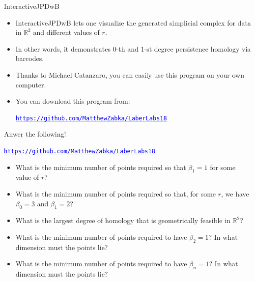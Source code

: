 \documentclass[usenames,dvipsnames,aspectratio=1610]{beamer}
\begin{document}

\begin{frame}{InteractiveJPDwB}
\begin{itemize}
\item InteractiveJPDwB lets one visualize the generated simplicial complex for data in $\mathbb{R}^2$ and different values of $r$.
\item In other words, it demonstrates $0$-th and $1$-st degree persistence homology via barcodes.
\item Thanks to Michael Catanzaro, you can easily use this program on your own computer.
\item You can download this program from:
\begin{center}
\hyperref[https://github.com/MatthewZabka/LaberLabs18]{\textcolor{blue}{\texttt{https://github.com/MatthewZabka/LaberLabs18}}}
\end{center}
\end{itemize}
\end{frame}


\begin{frame}{Anwer the following!}
\begin{center}
\hyperref[https://github.com/MatthewZabka/LaberLabs18]{\textcolor{blue}{\texttt{https://github.com/MatthewZabka/LaberLabs18}}}
\end{center}
\begin{itemize}
\item What is the minimum number of points required so that $\beta_1 = 1$ for some value of $r$?
\item What is the minimum number of points required so that, for some $r$, we have $\beta_0 = 3$ and $\beta_1 = 2$?
\item What is the largest degree of homology that is geometrically feasible in $\mathbb{R}^2$?
\item What is the minimum number of points required to have $\beta_2 = 1$? In what dimension must the points lie?
\item What is the minimum number of points required to have $\beta_n = 1$?  In what dimension must the points lie?
\end{itemize}
\end{frame}

\end{document}
